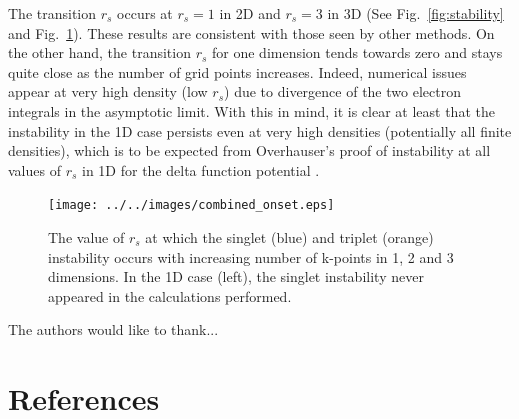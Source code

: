 \documentclass[preprint, journal=prl]{revtex4-1}
\begin{document}
  The transition $r_s$ occurs at $r_s = 1$ in 2D and $r_s = 3$ in 3D (See Fig.~\ref{fig:stability} and Fig.~\ref{fig:onset}). These results are consistent with those seen by other methods\cite{Baguet2014, Bernu2011}. On the other hand, the transition $r_s$ for one dimension tends towards zero and stays quite close as the number of grid points increases. Indeed, numerical issues appear at very high density (low $r_s$) due to divergence of the two electron integrals in the asymptotic limit. With this in mind, it is clear at least that the instability in the 1D case persists even at very high densities (potentially all finite densities), which is to be expected from Overhauser's proof of instability at all values of $r_s$ in 1D for the delta function potential \cite{Overhauser1962}.
  \begin{figure}
    \centering
    \texttt{[image: ../../images/combined\_onset.eps]}
    \caption{The value of $r_s$ at which the singlet (blue) and triplet (orange) instability    occurs with increasing number of k-points in 1, 2 and 3 dimensions. In the 1D case (left), the singlet instability never appeared in the calculations performed. }
    \label{fig:onset}
  \end{figure}
  
\begin{acknowledgements}
The authors would like to thank...
\end{acknowledgements}

\section{References}

\end{document}
